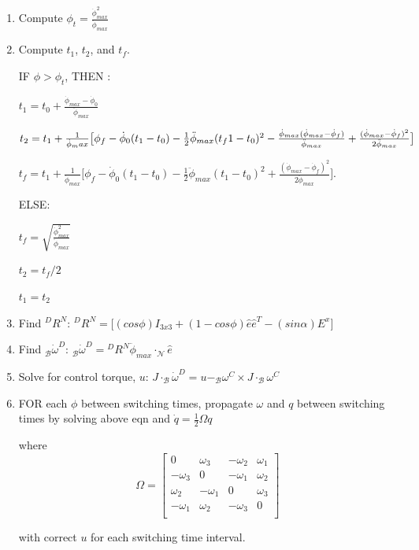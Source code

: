 \documentclass[letterpaper, preprint, paper,11pt]{AAS}	%
\begin{document}
	\begin{enumerate}
		
		\item Compute $\phi_{t} = \frac{\dot{\phi}_{max}^2}{\ddot{\phi}_{max}}$
		
		\item Compute $t_1$, $t_2$, and $t_f$. 
		
		IF $\phi > \phi_{t}$, THEN : 
		
		$
		t_1 = t_0 + \frac{\dot{\phi}_{max} - \dot{\phi}_0}{\ddot{\phi}_{max}}
		$ 
		
		$
		t_2 = t_1 + \frac{1}{\dot{\phi}_max} \big[ \phi_f - \dot{\phi}_0 (t_1 - t_0) - \frac{1}{2} \ddot{\phi}_{max} (t_f1 - t_0)^2 - \\ \frac{\dot{\phi}_{max} ( \dot{\phi}_{max} -  \dot{\phi}_f ) }{\ddot{\phi}_{max}} + \frac{ (\dot{\phi}_{max} - \dot{\phi}_f)^2}{2 \ddot{\phi}_{max}} \big]
		$
		
		$
		t_f=t_1+\frac{1}{\dot{\phi}_{max}}\Big[ \phi_f-\dot{\phi}_0(t_1-t_0)-\frac{1}{2}\ddot{\phi}_{max}(t_1-t_0)^2+\frac{(\dot{\phi}_{max}-\dot{\phi}_f)^2}{2\ddot{\phi}_{max}} \Big].
		$
		
		ELSE: 
		
		$ t_f = \sqrt{\frac{\dot{\phi}_{max}^2}{\ddot{\phi}_{max}}}
		$
		
		$ t_2 = t_f / 2 $ 
		
		$ t_1 = t_2 $ 
		
		\item Find ${}^DR^N$: 
		$
		{}^DR^N = \big[(cos\phi)I_{3x3} + (1 - cos\phi)\hat{e}\hat{e}^T - (sin\alpha)E^x \big]
		$
		
		\item Find $_\mathcal{B}\dot{\omega}^{D}$: 
		$
		_\mathcal{B}\dot{\omega}^{D} = {}^DR^N \ddot{\phi}_{max} \cdot _\mathcal{N}\hat{e}
		$
		
		\item Solve for control torque, $u$: 
		$
		J \cdot _\mathcal{B}\dot{\omega}^D = u - _\mathcal{B}\omega^C \times J \cdot _\mathcal{B}\omega^C 
		$
		
		\item FOR each $\phi$ between switching times, propagate $\omega$ and $q$ between switching times by solving above eqn and 
		$
		\dot{q} = \frac{1}{2} \Omega q 
		$
		
		where
		\[ \Omega = \left[ \begin{array}{cccc}
		0 & \omega_3 & -\omega_2 & \omega_1 \\
		-\omega_3 & 0 & -\omega_1 & \omega_2 \\
		\omega_2 & -\omega_1 & 0 & \omega_3 \\ 
		-\omega_1 & \omega_2 & -\omega_3 & 0 \\ 
		\end{array} \right] \] 
		
		with correct $u$ for each switching time interval. 
		
	\end{enumerate} 
\end{document}
